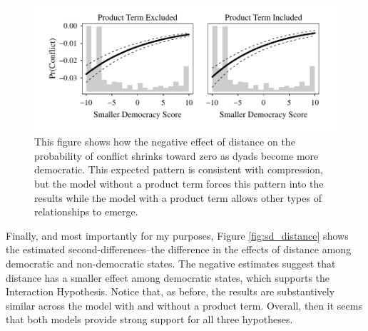 \documentclass[12pt]{article}
\begin{document}
                \begin{figure}[H]
        \begin{center}
        \includegraphics[scale = .8]{fig/fd_democracy.pdf}
        \end{center}\caption{This figure shows how the negative effect of distance on the probability of conflict shrinks toward zero as dyads become more democratic. This expected pattern is consistent with compression, but the model without a product term forces this pattern into the results while the model with a product term allows other types of relationships to emerge.}\label{fig:fd_democracy}
        \end{figure}

Finally, and most importantly for my purposes, Figure \ref{fig:sd_distance} shows the estimated second-differences--the difference in the effects of distance among democratic and non-democratic states. The negative estimates suggest that distance has a smaller effect among democratic states, which supports the Interaction Hypothesis. Notice that, as before, the results are substantively similar across the model with and without a product term. Overall, then it seems that both models provide strong support for all three hypotheses. 
\end{document}
